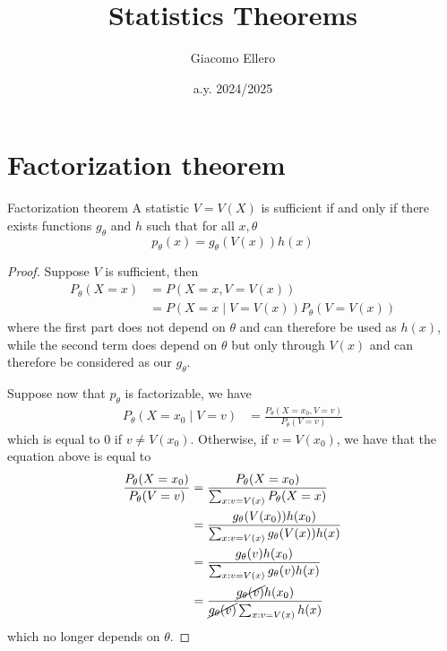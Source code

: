 \documentclass[12pt]{extarticle}
\title{Statistics Theorems}
\author{Giacomo Ellero}
\date{a.y. 2024/2025}
\begin{document}
\maketitle
\tableofcontents

\section{Factorization theorem}

\begin{theorem}{Factorization theorem}{}
	A statistic $V = V(X)$ is sufficient if and only if there exists functions $g_\theta$ and $h$
	such that for all $x, \theta$
	\begin{equation}
		p_\theta(x) = g_\theta(V(x)) h(x)
	\end{equation}
\end{theorem}

\begin{proof}
	Suppose $V$ is sufficient, then
	\begin{align}
		P_\theta(X = x) & = P(X = x, V = V(x))                        \\
		                & = P(X = x \mid V = V(x)) P_\theta(V = V(x))
	\end{align}
	where the first part does not depend on $\theta$ and can therefore be used as $h(x)$,
	while the second term does depend on $\theta$ but only through $V(x)$ and can therefore
	be considered as our $g_\theta$.

	Suppose now that $p_\theta$ is factorizable, we have
	\begin{align}
		P_\theta(X = x_0 \mid V = v) & = \frac{P_\theta(X = x_0, V = v)}{P_\theta(V = v)}
	\end{align}
	which is equal to $0$ if $v \ne V(x_0)$.
	Otherwise, if $v = V(x_0)$, we have that the equation above is equal to
	\begin{align}
		\frac{P_\theta(X= x_0)}{P_\theta(V = v)} & = \frac{P_\theta(X = x_0)}{\sum_{x : v = V(x)} P_\theta(X = x)}                     \\
		                                         & = \frac{g_\theta(V(x_0))h(x_0)}{\sum_{x : v = V(x)} g_\theta(V(x))h(x)}             \\
		                                         & = \frac{g_\theta(v)h(x_0)}{\sum_{x : v = V(x)} g_\theta(v)h(x)}                     \\
		                                         & = \frac{\cancel{g_\theta(v)} h(x_0)}{\cancel{g_\theta(v)} \sum_{x : v = V(x)} h(x)}
	\end{align}
	which no longer depends on $\theta$.
\end{proof}
\end{document}
